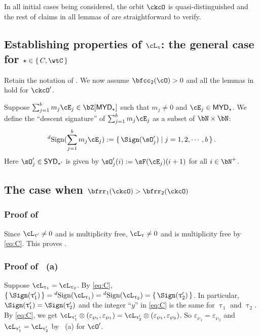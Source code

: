 \documentclass[12pt,a4paper]{amsart}
\def\SYD{{\mathsf{SYD}}}
\def\MYD{{\mathsf{MYD}}}
\numberwithin{equation}{section}
\theoremstyle{remark}
\def\PBPes{\mathrm{PBP}^{\mathrm{ext}}_{\star}}
\def\cOp{\cO^{\prime}}
\begin{document}


\smallskip

In all initial cases being considered, the orbit $\ckcO$ is quasi-distinguished and the rest of claims in all lemmas
of  are straightforward to verify.


\subsection{Establishing properties of $\ac_{\uptau}$: the general case for $\star\in \set{C,\wtC}$}
Retain the notation of
. We now assume $\bfcc_{2}(\cO)>0$ and all the lemmas in
 hold for $\ckcO'$.

Suppose $\sum_{j=1}^{b} m_{j} \cE_{j}\in \bZ[\MYD_{\star}]$ such that $m_{j}\neq
0$ and $\cE_{j}\in \MYD_{\star}$. We define the ``descent signature'' of
$\sum_{j=1}^{b} m_{j} \cE_{j}$ as a subset of $\bN\times \bN$:
\[
  \dsign(\sum_{j=1}^{b} m_{j} \cE_{j}) := \set{\Sign(\sO'_{j})|j=1,2,\cdots, b}.
\]
Here $\sO'_{j} \in \SYD_{\star'}$ is given by $\sO'_{j}(i) := \sF(\cE_{j})(i+1)$
for all $i\in \bN^{+}$. %

\subsection*{The case when $\bfrr_{1}(\ckcO)>\bfrr_{2}(\ckcO)$}

\subsubsection*{Proof of } Since $\ac_{\uptau'}\neq 0$ and
is multiplicity free, $\ac_{\uptau}\neq 0$ and is multiplicity free by \eqref{eq:C}.
This proves .

\smallskip

\subsubsection*{Proof of ~(a)} Suppose
$\ac_{\uptau_{1}}=\ac_{\uptau_{2}}$. By \eqref{eq:C},
$\set{\Sign(\uptau'_{1})}=\dsign(\ac_{\uptau_{1}}) =\dsign(\ac_{\uptau_{2}}) =
\set{\Sign(\uptau'_{2})}$. In particular,
$\Sign(\uptau'_{1})=\Sign(\uptau'_{2})$ and the integer ``$y$'' in \eqref{eq:C}
is the same for $\uptau_{1}$ and $\uptau_{2}$. By \eqref{eq:C}, we get
$\ac_{\uptau'_{1}}\otimes
(\varepsilon_{\wp_{1}},\varepsilon_{\wp_{1}})=\ac_{\uptau'_{2}}\otimes
(\varepsilon_{\wp_{1}}, \varepsilon_{\wp_{2}})$. So
$\varepsilon_{\wp_{1}}=\varepsilon_{\wp_{2}}$ and
$\ac_{\uptau'_{1}}=\ac_{\uptau'_{2}}$ by ~(a) for $\cOp$.
\end{document}
